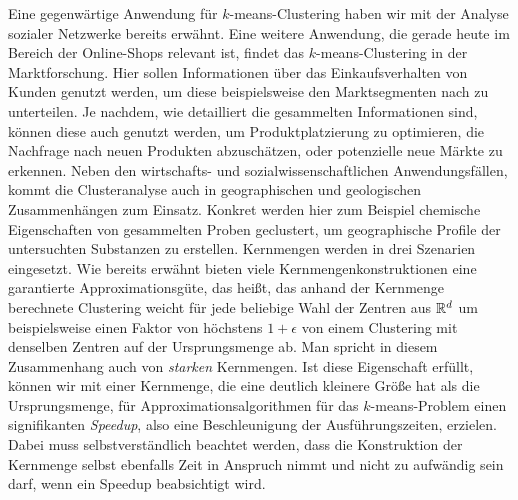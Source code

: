 Eine gegenwärtige Anwendung für $k$-means-Clustering haben wir mit der Analyse sozialer Netzwerke bereits erwähnt. Eine weitere
Anwendung, die gerade heute im Bereich der Online-Shops relevant ist, findet das $k$-means-Clustering in der Marktforschung.
Hier sollen Informationen über das Einkaufsverhalten von Kunden genutzt werden, um diese beispielsweise den Marktsegmenten nach
zu unterteilen. Je nachdem, wie detailliert die gesammelten Informationen sind, können diese auch genutzt werden, um
Produktplatzierung zu optimieren, die Nachfrage nach neuen Produkten abzuschätzen, oder potenzielle neue Märkte zu
erkennen. Neben den wirtschafts- und sozialwissenschaftlichen Anwendungsfällen, kommt die Clusteranalyse auch in
geographischen und geologischen Zusammenhängen zum Einsatz. Konkret werden hier zum Beispiel chemische Eigenschaften von gesammelten
Proben geclustert, um geographische Profile der untersuchten Substanzen zu erstellen.
\absatz
Kernmengen werden in drei Szenarien eingesetzt. Wie bereits erwähnt bieten viele Kernmengenkonstruktionen
eine garantierte Approximationsgüte, das heißt, das anhand der Kernmenge berechnete Clustering weicht für jede beliebige
Wahl der Zentren aus $\mathbb{R}^{d}$ um beispielsweise einen Faktor von höchstens $1 + \epsilon$ von einem Clustering mit denselben
Zentren auf der Ursprungsmenge ab. Man spricht in diesem Zusammenhang auch von \emph{starken} Kernmengen.
Ist diese Eigenschaft erfüllt, können wir mit einer Kernmenge, die eine deutlich kleinere Größe hat als die Ursprungsmenge,
für Approximationsalgorithmen für das $k$-means-Problem einen signifikanten \emph{Speedup}, also eine Beschleunigung der
Ausführungszeiten, erzielen. Dabei muss selbstverständlich beachtet werden, dass die Konstruktion der Kernmenge selbst
ebenfalls Zeit in Anspruch nimmt und nicht zu aufwändig sein darf, wenn ein Speedup beabsichtigt wird. 

